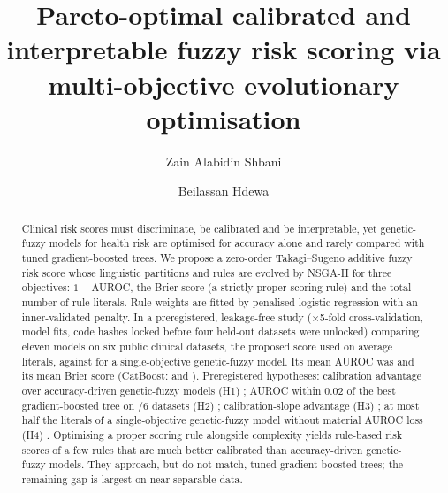 \documentclass[preprint,12pt]{elsarticle}
\begin{document}
\begin{frontmatter}

\title{Pareto-optimal calibrated and interpretable fuzzy risk scoring via multi-objective evolutionary optimisation}

\author[a]{Zain Alabidin Shbani}

\author[b]{Beilassan Hdewa}


\begin{abstract}
Clinical risk scores must discriminate, be calibrated and be interpretable, yet
genetic-fuzzy models for health risk are optimised for accuracy alone and rarely
compared with tuned gradient-boosted trees. We propose a zero-order Takagi--Sugeno
additive fuzzy risk score whose linguistic partitions and rules are evolved by NSGA-II
for three objectives: $1-$AUROC, the Brier score (a strictly proper scoring rule) and
the total number of rule literals. Rule weights are fitted by penalised logistic
regression with an inner-validated penalty. In a preregistered, leakage-free study
(\resNSeeds{}$\times$5-fold cross-validation, \resNFits{} model fits, code hashes locked
before four held-out datasets were unlocked) comparing eleven models on six public
clinical datasets, the proposed score used on average \resMOLiteralsAll{} literals, against
\resHybridLiteralsAll{} for a single-objective genetic-fuzzy model. Its mean AUROC was
\resMOAurocAll{} and its mean Brier score \resMOBrierAll{} (CatBoost: \resMeanAurocAllCatBoost{}
and \resMeanBrierAllCatBoost{}). Preregistered hypotheses:
calibration advantage over accuracy-driven genetic-fuzzy models (H1) \resHOne{};
AUROC within 0.02 of the best gradient-boosted tree on \resHTwoN{}/6 datasets (H2)
\resHTwo{}; calibration-slope advantage (H3) \resHThree{}; at most half the literals of a
single-objective genetic-fuzzy model without material AUROC loss (H4) \resHFour{}.
Optimising a proper scoring rule alongside complexity yields rule-based risk scores of
a few rules that are much better calibrated than accuracy-driven genetic-fuzzy models.
They approach, but do not match, tuned gradient-boosted trees; the remaining gap is
largest on near-separable data.
\end{abstract}


\end{frontmatter}
\end{document}
